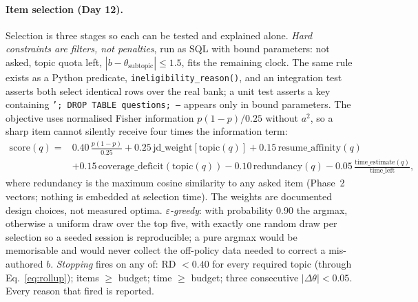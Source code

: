 \documentclass{tietreport}
\begin{document}
\paragraph{Item selection (Day 12).} Selection is three stages so each can be tested and
explained alone. \emph{Hard constraints are filters, not penalties}, run as SQL with bound
parameters: not asked, topic quota left, $|b-\theta_{\text{subtopic}}|\le1.5$, fits the remaining
clock. The same rule exists as a Python predicate, \texttt{ineligibility\_reason()}, and an
integration test asserts both select identical rows over the real bank; a unit test asserts a
key containing \texttt{'; DROP TABLE questions; --} appears only in bound parameters. The objective
uses normalised Fisher information $p(1-p)/0.25$ without $a^2$, so a sharp item cannot silently
receive four times the information term:
\begin{equation}
\begin{aligned}
  \mathrm{score}(q) = {}& 0.40\,\tfrac{p(1-p)}{0.25} + 0.25\,\mathrm{jd\_weight}[\mathrm{topic}(q)]
    + 0.15\,\mathrm{resume\_affinity}(q) \\
  &+ 0.15\,\mathrm{coverage\_deficit}(\mathrm{topic}(q)) - 0.10\,\mathrm{redundancy}(q)
    - 0.05\,\tfrac{\mathrm{time\_estimate}(q)}{\mathrm{time\_left}},
\end{aligned}
\label{eq:objective}
\end{equation}
where redundancy is the maximum cosine similarity to any asked item (Phase~2 vectors; nothing
is embedded at selection time). The weights are documented design choices, not measured optima.
\emph{$\varepsilon$-greedy}: with probability 0.90 the argmax, otherwise a uniform draw over the
top five, with exactly one random draw per selection so a seeded session is reproducible; a
pure argmax would be memorisable and would never collect the off-policy data needed to correct
a mis-authored $b$. \emph{Stopping} fires on any of: RD $<0.40$ for every required topic
(through Eq.~\eqref{eq:rollup}); items $\ge$ budget; time $\ge$ budget; three consecutive
$|\Delta\theta|<0.05$. Every reason that fired is reported.
\end{document}
